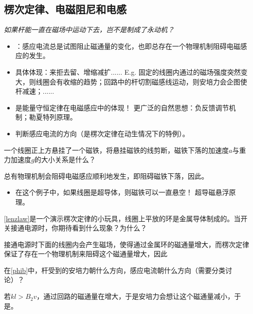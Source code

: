 \documentclass[a4paper,9pt]{ctexart}
\begin{document}
\subsection{楞次定律、电磁阻尼和电感}
\emph{如果杆能一直在磁场中运动下去，岂不是制成了永动机？}
\begin{itemize}
\item
{}：感应电流总是试图阻止磁通量的变化，也即总存在一个物理机制阻碍电磁感应的发生。
\item
具体体现：来拒去留、增缩减扩...... \so E.g. 固定的线圈内通过的磁场强度突然变大，则线圈会有收缩的趋势；回路中的杆切割磁感线运动，则安培力会企图使杆减速；......
\item
是能量守恒定律在电磁感应中的体现！ \so 更广泛的自然思想：负反馈调节机制；勒夏特列原理。
\item
{}判断感应电流的方向（是楞次定律在动生情况下的特例）。

\end{itemize}
\begin{eg}
一个线圈正上方悬挂了一个磁铁，将悬挂磁铁的线剪断，磁铁下落的加速度$a$与重力加速度$g$的大小关系是什么？
\end{eg}
\begin{ans}
总有物理机制会阻碍电磁感应顺利地发生，即阻碍磁铁下落，因此\uline{\hspace{4cm}}。
\end{ans}
\begin{itemize}
\item
在这个例子中，如果线圈是超导体，则磁铁可以一直悬空！ \so 超导磁悬浮原理。
\end{itemize}
\begin{eg}
\cref{lenzlaw}是一个演示楞次定律的小玩具，线圈上平放的环是金属导体制成的。当开关接通电源时，你期待看到什么现象？为什么？
\end{eg}
\begin{ans}
接通电源时下面的线圈内会产生磁场，使得通过金属环的磁通量增大，而楞次定律保证了存在一个物理机制来阻碍这个磁通量增大，因此\uline{\hspace{2cm}}
\end{ans}
\begin{eg}
在\cref{phib}中，杆受到的安培力朝什么方向，感应电流朝什么方向（需要分类讨论）？
\end{eg}
\begin{ans}
若$kl>B_2 v$，通过回路的磁通量在增大，于是安培力会想让这个磁通量减小，于是\uline{\hspace{6cm}}。
\vspace{5cm}
\end{ans}
\end{document}
